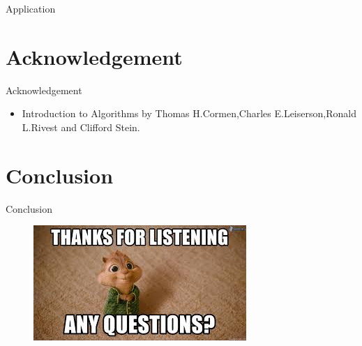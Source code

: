 \documentclass{beamer}
\begin{document}
    
    \begin{frame}{Application}
       
        
    \end{frame}
    
    \section{Acknowledgement}
    
        \begin{frame}{Acknowledgement}
            
        \begin{itemize}
            \item  Introduction to Algorithms by Thomas H.Cormen,Charles E.Leiserson,Ronald L.Rivest and Clifford Stein.
        \end{itemize}    
            
            
        \end{frame}
        
        \section{Conclusion}
        
            \begin{frame} {Conclusion}
                
                \begin{figure}
                \centering
                \includegraphics[width=.8\textwidth]{Pictures/Q.jpg}
                \label{fig:mazepic}
    \end{figure}
                
            \end{frame}
\end{document}
